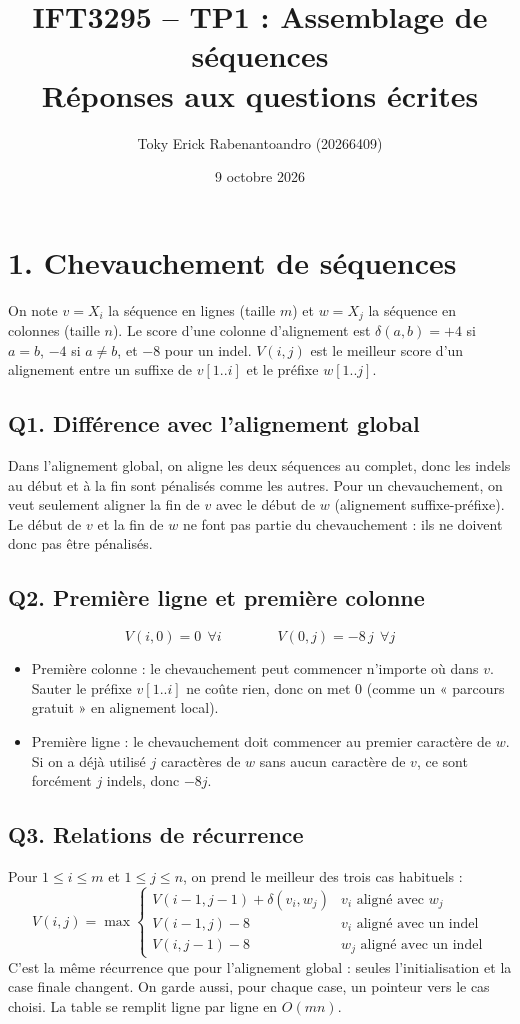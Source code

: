 \documentclass[11pt]{article}
\title{IFT3295 -- TP1 : Assemblage de séquences\\\large Réponses aux questions écrites}
\author{Toky Erick Rabenantoandro (20266409)}
\date{9 octobre 2026}
\begin{document}
\maketitle


\section*{1. Chevauchement de séquences}
On note $v=X_i$ la séquence en lignes (taille $m$) et $w=X_j$ la séquence en colonnes (taille $n$).
Le score d'une colonne d'alignement est $\delta(a,b)=+4$ si $a=b$, $-4$ si $a\neq b$, et $-8$ pour un indel.
$V(i,j)$ est le meilleur score d'un alignement entre un suffixe de $v[1..i]$ et le préfixe $w[1..j]$.

\subsection*{Q1. Différence avec l'alignement global}
Dans l'alignement global, on aligne les deux séquences au complet, donc les indels au début et à la fin sont
pénalisés comme les autres. Pour un chevauchement, on veut seulement aligner la fin de $v$ avec le début de $w$
(alignement suffixe-préfixe). Le début de $v$ et la fin de $w$ ne font pas partie du chevauchement : ils ne
doivent donc pas être pénalisés.

\subsection*{Q2. Première ligne et première colonne}
\[ V(i,0)=0 \ \ \forall i \qquad\qquad V(0,j)=-8\,j \ \ \forall j \]
\begin{itemize}
\item Première colonne : le chevauchement peut commencer n'importe où dans $v$. Sauter le préfixe $v[1..i]$ ne
coûte rien, donc on met 0 (comme un « parcours gratuit » en alignement local).
\item Première ligne : le chevauchement doit commencer au premier caractère de $w$. Si on a déjà utilisé $j$
caractères de $w$ sans aucun caractère de $v$, ce sont forcément $j$ indels, donc $-8j$.
\end{itemize}

\subsection*{Q3. Relations de récurrence}
Pour $1\le i\le m$ et $1\le j\le n$, on prend le meilleur des trois cas habituels :
\[
V(i,j)=\max\begin{cases}
V(i-1,j-1)+\delta(v_i,w_j) & v_i \text{ aligné avec } w_j\\
V(i-1,j)-8 & v_i \text{ aligné avec un indel}\\
V(i,j-1)-8 & w_j \text{ aligné avec un indel}
\end{cases}
\]
C'est la même récurrence que pour l'alignement global : seules l'initialisation et la case finale changent.
On garde aussi, pour chaque case, un pointeur vers le cas choisi. La table se remplit ligne par ligne en $O(mn)$.
\end{document}
